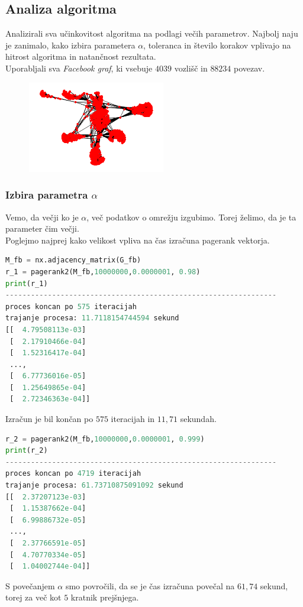 \documentclass[a4paper]{article}
\begin{document}
\subsection{Analiza algoritma}
\hspace{4.8mm}Analizirali sva učinkovitost algoritma na podlagi večih parametrov. Najbolj naju je zanimalo, kako izbira parametera $\alpha$, toleranca in število korakov vplivajo na hitrost algoritma in natančnost rezultata. \\
Uporabljali sva \textit{Facebook graf}, ki vsebuje $4039$ vozlišč in $88234$ povezav.
\begin{figure}[h]
\begin{center} 
\includegraphics[width=6cm]{Facebook_graph.png}
\end{center}
\end{figure}

\subsubsection{Izbira parametra $\alpha$} 
\hspace{4.8mm}Vemo, da večji ko je $\alpha$, več podatkov o omrežju izgubimo. Torej želimo, da je ta parameter čim večji. \\
Poglejmo najprej kako velikost vpliva na čas izračuna pagerank vektorja. 

\begin{lstlisting}[language=Python]
M_fb = nx.adjacency_matrix(G_fb)
r_1 = pagerank2(M_fb,10000000,0.0000001, 0.98)
print(r_1)
----------------------------------------------------------------
proces koncan po 575 iteracijah
trajanje procesa: 11.7118154744594 sekund
[[  4.79508113e-03]
 [  2.17910466e-04]
 [  1.52316417e-04]
 ..., 
 [  6.77736016e-05]
 [  1.25649865e-04]
 [  2.72346363e-04]]
\end{lstlisting}

Izračun je bil končan po $575$ iteracijah in $11,71$ sekundah.

\begin{lstlisting}[language=Python]
r_2 = pagerank2(M_fb,10000000,0.0000001, 0.999)
print(r_2)
----------------------------------------------------------------
proces koncan po 4719 iteracijah
trajanje procesa: 61.73710875091092 sekund
[[  2.37207123e-03]
 [  1.15387662e-04]
 [  6.99886732e-05]
 ..., 
 [  2.37766591e-05]
 [  4.70770334e-05]
 [  1.04002744e-04]]
\end{lstlisting}
S povečanjem $\alpha$ smo povročili, da se je čas izračuna povečal na $61,74$ sekund, torej za več kot $5$ kratnik prejšnjega. 
\end{document}
